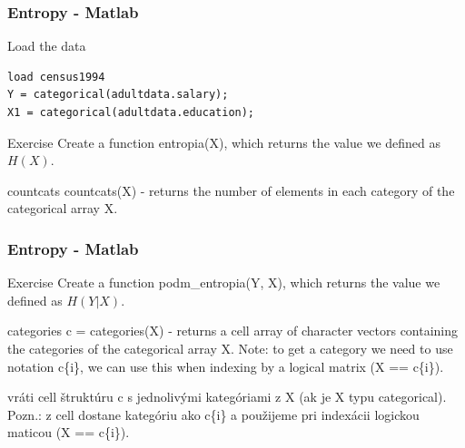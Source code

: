 \documentclass{beamer}
\begin{document}
\begin{frame}[fragile]
\frametitle{Entropy - Matlab}
\begin{block}{Load the data}
\begin{verbatim}
load census1994
Y = categorical(adultdata.salary);
X1 = categorical(adultdata.education);
\end{verbatim}
\end{block}

\begin{block}{Exercise}
Create a function entropia(X), which returns the value we defined as $H(X)$.
\end{block}

\begin{block}{countcats}
countcats(X) - returns the number of elements in each category of the categorical array X.
\end{block}
\end{frame}


\begin{frame}
\frametitle{Entropy - Matlab}

\begin{block}{Exercise}
Create a function podm\_entropia(Y, X), which returns the value we defined as $H(Y|X)$.
\end{block}

\begin{block}{categories}
c = categories(X) - returns a cell array of character vectors containing the categories of the categorical array X. Note: to get a category we need to use notation c\{i\}, we can use this when indexing by a logical matrix (X == c\{i\}).

vráti cell štruktúru c s jednolivými kategóriami z X (ak je X typu categorical).  Pozn.: z cell dostane kategóriu ako c\{i\} a použijeme pri indexácii logickou maticou (X == c\{i\}).
\end{block}
\end{frame}
\end{document}
